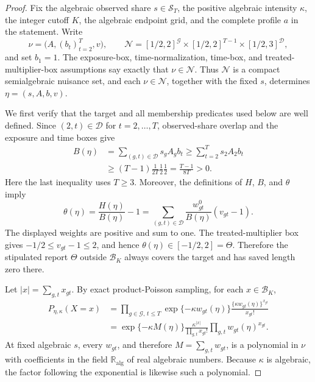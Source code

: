 \documentclass{article}
\begin{document}
\begin{proof}
Fix the algebraic observed share \(s\in\mathcal S_T\), the positive algebraic intensity \(\kappa\), the integer cutoff \(K\), the algebraic endpoint grid, and the complete profile \(a\) in the statement.  Write
\[
 \nu=\bigl(A,(b_t)_{t=2}^T,v\bigr),
 \qquad
 \mathcal N=[1/2,2]^{\mathcal G}\times[1/2,2]^{T-1}
                    \times[1/2,3]^{\mathcal D},
\]
and set \(b_1=1\).  The exposure-box, time-normalization, time-box, and treated-multiplier-box assumptions say exactly that \(\nu\in\mathcal N\).  Thus \(\mathcal N\) is a compact semialgebraic nuisance set, and each \(\nu\in\mathcal N\), together with the fixed \(s\), determines \(\eta=(s,A,b,v)\).

We first verify that the target and all membership predicates used below are well defined.  Since \((2,t)\in\mathcal D\) for \(t=2,\ldots,T\), observed-share overlap and the exposure and time boxes give
\[
\begin{aligned}
B(\eta)
 &=\sum_{(g,t)\in\mathcal D}s_gA_gb_t
 \ge \sum_{t=2}^T s_2A_2b_t                                      \\
 &\ge (T-1)\frac{1}{2T}\frac12\frac12
 =\frac{T-1}{8T}>0.
\end{aligned}
\]
Here the last inequality uses \(T\ge3\).  Moreover, the definitions of \(H\), \(B\), and \(\theta\) imply
\[
 \theta(\eta)
 =\frac{H(\eta)}{B(\eta)}-1
 =\sum_{(g,t)\in\mathcal D}
   \frac{w^0_{gt}}{B(\eta)}(v_{gt}-1).
\]
The displayed weights are positive and sum to one.  The treated-multiplier box gives \(-1/2\le v_{gt}-1\le2\), and hence \(\theta(\eta)\in[-1/2,2]=\Theta\).  Therefore the stipulated report \(\Theta\) outside \(\mathcal B_K\) always covers the target and has saved length zero there.

Let \(|x|=\sum_{g,t}x_{gt}\).  By exact product-Poisson sampling, for each \(x\in\mathcal B_K\),
\[
\begin{aligned}
P_{\eta,\kappa}(X=x)
 &=\prod_{g\in\mathcal G,\,t\le T}
   \exp\{-\kappa w_{gt}(\eta)\}
   \frac{\{\kappa w_{gt}(\eta)\}^{x_{gt}}}{x_{gt}!}             \\
 &=\exp\{-\kappa M(\eta)\}
   \frac{\kappa^{|x|}}{\prod_{g,t}x_{gt}!}
   \prod_{g,t}w_{gt}(\eta)^{x_{gt}}.
\end{aligned}
\]
At fixed algebraic \(s\), every \(w_{gt}\), and therefore \(M=\sum_{g,t}w_{gt}\), is a polynomial in \(\nu\) with coefficients in the field \(\mathbb R_{\mathrm{alg}}\) of real algebraic numbers.  Because \(\kappa\) is algebraic, the factor following the exponential is likewise such a polynomial.


\end{proof}
\end{document}

